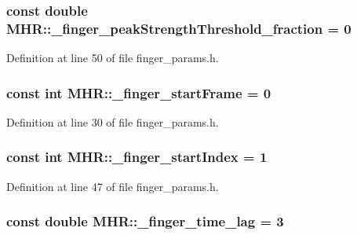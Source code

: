 \hypertarget{namespace_m_h_r_a417e8c2df65251a5a34b250f975a3867}{
\subsubsection[{\+\_\+finger\+\_\+peak\+Strength\+Threshold\+\_\+fraction}]{\setlength{\rightskip}{0pt plus 5cm}const double M\+H\+R\+::\+\_\+finger\+\_\+peak\+Strength\+Threshold\+\_\+fraction = 0}}\label{namespace_m_h_r_a417e8c2df65251a5a34b250f975a3867}


Definition at line 50 of file finger\+\_\+params.\+h.

\hypertarget{namespace_m_h_r_a9b0e8542961b24a5dc2e1f77df715b51}{
\subsubsection[{\+\_\+finger\+\_\+start\+Frame}]{\setlength{\rightskip}{0pt plus 5cm}const int M\+H\+R\+::\+\_\+finger\+\_\+start\+Frame = 0}}\label{namespace_m_h_r_a9b0e8542961b24a5dc2e1f77df715b51}


Definition at line 30 of file finger\+\_\+params.\+h.

\hypertarget{namespace_m_h_r_a25e5a8e8b0d72f6cfa98fa75e943f35e}{
\subsubsection[{\+\_\+finger\+\_\+start\+Index}]{\setlength{\rightskip}{0pt plus 5cm}const int M\+H\+R\+::\+\_\+finger\+\_\+start\+Index = 1}}\label{namespace_m_h_r_a25e5a8e8b0d72f6cfa98fa75e943f35e}


Definition at line 47 of file finger\+\_\+params.\+h.

\hypertarget{namespace_m_h_r_ae2523999aef7718ac3e6edeb318edf8a}{
\subsubsection[{\+\_\+finger\+\_\+time\+\_\+lag}]{\setlength{\rightskip}{0pt plus 5cm}const double M\+H\+R\+::\+\_\+finger\+\_\+time\+\_\+lag = 3}}\label{namespace_m_h_r_ae2523999aef7718ac3e6edeb318edf8a}


